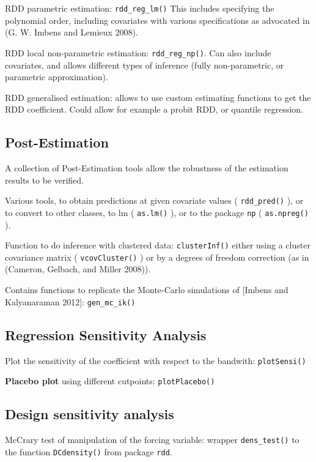 \documentclass[article]{jss}
\begin{document}
RDD parametric estimation: \texttt{rdd\_reg\_lm()} This includes
specifying the polynomial order, including covariates with various
specifications as advocated in (G. W. Imbens and Lemieux 2008).

RDD local non-parametric estimation: \texttt{rdd\_reg\_np()}. Can also
include covariates, and allows different types of inference (fully
non-parametric, or parametric approximation).

RDD generalised estimation: allows to use custom estimating functions to
get the RDD coefficient. Could allow for example a probit RDD, or
quantile regression.

\subsection{Post-Estimation}\label{post-estimation}

A collection of Post-Estimation tools allow the robustness of the
estimation results to be verified.

Various tools, to obtain predictions at given covariate values (
\texttt{rdd\_pred()} ), or to convert to other classes, to lm (
\texttt{as.lm()} ), or to the package \texttt{np} ( \texttt{as.npreg()}
).

Function to do inference with clustered data: \texttt{clusterInf()}
either using a cluster covariance matrix ( \texttt{vcovCluster()} ) or
by a degrees of freedom correction (as in (Cameron, Gelbach, and Miller
2008)).

Contains functions to replicate the Monte-Carlo simulations of {[}Imbens
and Kalyanaraman 2012{]}: \texttt{gen\_mc\_ik()}

\subsection{Regression Sensitivity
Analysis}\label{regression-sensitivity-analysis}

Plot the sensitivity of the coefficient with respect to the bandwith:
\texttt{plotSensi()}

\textbf{Placebo plot} using different cutpoints: \texttt{plotPlacebo()}

\subsection{Design sensitivity
analysis}\label{design-sensitivity-analysis}

McCrary test of manipulation of the forcing variable: wrapper
\texttt{dens\_test()} to the function \texttt{DCdensity()} from package
\texttt{rdd}.
\end{document}
